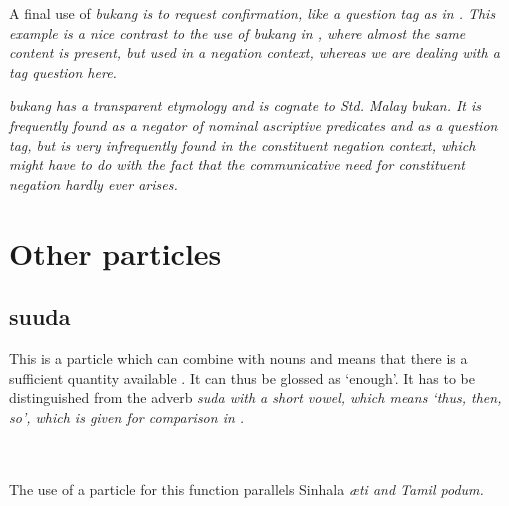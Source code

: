A final use of \em bukang \em is to request confirmation, like a question tag as in . This example is a nice contrast to the use of \em bukang \em in , where almost the same content is present, but used in a negation context, whereas we are dealing with a tag question here.


\em bukang \em has a transparent etymology  and is cognate to Std. Malay \em bukan\em. It is frequently found as a negator of nominal ascriptive predicates and as a question tag, but is very infrequently found in the constituent negation context, which might have to do with the fact that the communicative need for constituent negation hardly ever arises.

\section{Other particles}\label{sec:wc:Otherparticles}

\subsection{suuda}\label{sec:wc:suuda}
This is a particle which can  combine with nouns and means that there is a sufficient quantity available . It can thus be glossed as `enough'. It has to be distinguished from the adverb \em suda \em with a short vowel, which means `thus, then, so', which is given for comparison  in .


\\


\\

The use of a  particle for this function parallels Sinhala \em \ae ti \em and Tamil \em podum\em.

